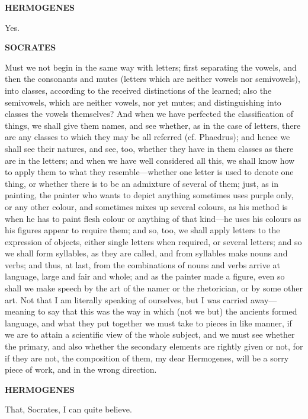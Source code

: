 \documentclass[11pt,letter]{article}
\begin{document}
\par \textbf{HERMOGENES}
\par   Yes.

\par \textbf{SOCRATES}
\par   Must we not begin in the same way with letters; first separating the vowels, and then the consonants and mutes (letters which are neither vowels nor semivowels), into classes, according to the received distinctions of the learned; also the semivowels, which are neither vowels, nor yet mutes; and distinguishing into classes the vowels themselves? And when we have perfected the classification of things, we shall give them names, and see whether, as in the case of letters, there are any classes to which they may be all referred (cf. Phaedrus); and hence we shall see their natures, and see, too, whether they have in them classes as there are in the letters; and when we have well considered all this, we shall know how to apply them to what they resemble—whether one letter is used to denote one thing, or whether there is to be an admixture of several of them; just, as in painting, the painter who wants to depict anything sometimes uses purple only, or any other colour, and sometimes mixes up several colours, as his method is when he has to paint flesh colour or anything of that kind—he uses his colours as his figures appear to require them; and so, too, we shall apply letters to the expression of objects, either single letters when required, or several letters; and so we shall form syllables, as they are called, and from syllables make nouns and verbs; and thus, at last, from the combinations of nouns and verbs arrive at language, large and fair and whole; and as the painter made a figure, even so shall we make speech by the art of the namer or the rhetorician, or by some other art. Not that I am literally speaking of ourselves, but I was carried away—meaning to say that this was the way in which (not we but) the ancients formed language, and what they put together we must take to pieces in like manner, if we are to attain a scientific view of the whole subject, and we must see whether the primary, and also whether the secondary elements are rightly given or not, for if they are not, the composition of them, my dear Hermogenes, will be a sorry piece of work, and in the wrong direction.

\par \textbf{HERMOGENES}
\par   That, Socrates, I can quite believe.
\end{document}
